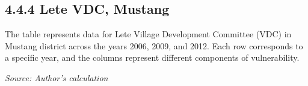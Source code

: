 \subsection*{4.4.4 Lete VDC, Mustang}
The table represents data for Lete Village Development Committee (VDC) in Mustang district across the years 2006, 2009, and 2012. Each row corresponds to a specific year, and the columns represent different components of vulnerability.
\begin{table}[ht]
	\captionsetup{labelformat=empty}
	\caption{Table 4.8: Mean of the HVI components for Lete VDC, Mustang}
	\label{tab:hviletecomponents}
	\textit{Source: Author's calculation}
\end{table}
